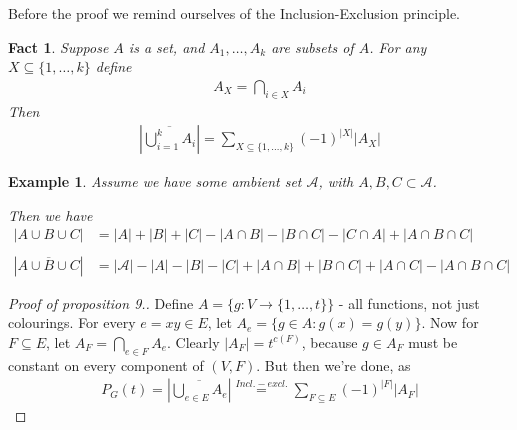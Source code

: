 \documentclass[a4paper]{article}
\theoremstyle{plain}
\newtheorem{fact}[lemma]{Fact}
\theoremstyle{myremark}
\newtheorem{example}[lemma]{Example}
\begin{document}
Before the proof we remind ourselves of the Inclusion-Exclusion principle.
\begin{fact}
Suppose $A$ is a set, and $A_1,\dots , A_k$ are subsets of $A$. For any $X\subseteq \lbrace 1,\dots , k\rbrace$ define
\begin{align*}
A_X=\bigcap_{i\in X} A_i
\end{align*}
Then
\begin{align*}
\left| \overline{\bigcup_{i=1}^k A_i}\right| = \sum_{X\subseteq \lbrace 1,\dots , k\rbrace} (-1)^{|X|}|A_X|
\end{align*}
\end{fact}
\begin{example} Assume we have some ambient set $\mathcal{A}$, with  $A,B,C \subset \mathcal{A}$.\\
\def\firstcircle{(0,0) circle (1.5cm)}
\def\secondcircle{(60:2cm) circle (1.5cm)}
\def\thirdcircle{(0:2cm) circle (1.5cm)}
\begin{center}
\end{center}
Then we have
\begin{align*}
|A\cup B \cup C| &= |A|+|B|+|C| -|A\cap B|-|B\cap C|-|C\cap A| + |A\cap B\cap C|\\\\
|\overline{A\cup B\cup C}|&= |\mathcal{A} | - |A|-|B|-|C| +|A\cap B|+|B\cap C|+|A\cap C| -|A\cap B\cap C|
\end{align*}
\end{example}
\begin{proof}[Proof of proposition 9.]
Define $A=\lbrace g:V\to \lbrace 1,\dots ,t\rbrace\rbrace$ - all functions, not just colourings. For every $e=xy\in E$, let $A_e=\lbrace g\in A : g(x)=g(y)\rbrace$. Now for $F\subseteq E$, let $A_F= \bigcap_{e\in F} A_e$. Clearly $|A_F|=t^{c(F)}$, because $g\in A_F$ must be constant on every component of $(V,F)$. But then we're done, as 
\begin{align*}
P_G(t)= \left| \overline{\bigcup_{e\in E} A_e}\right| \overset{Incl.-excl.}{=} \sum_{F\subseteq E} (-1)^{|F|} |A_F|
\end{align*}
\end{proof}
\end{document}
